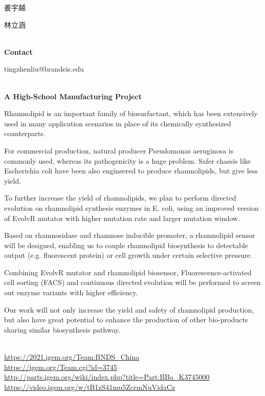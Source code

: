   姜宇越

  林立涵


\textbf{\\Contact}

  tingzhenliu@brandeis.edu


\textbf{\\A High-School Manufacturing Project\\}\begin{spacing}{1.5}

Rhamnolipid is an important family of biosurfactant, which has been extensively used in many application scenarios in place of its chemically synthesized counterparts.

For commercial production, natural producer Pseudomonas aeruginosa is commonly used, whereas its pathogenicity is a huge problem. Safer chassis like Escherichia coli have been also engineered to produce rhamnolipids, but give less yield.

To further increase the yield of rhamnolipids, we plan to perform directed evolution on rhamnolipid synthesis enzymes in E. coli, using an improved version of EvolvR mutator with higher mutation rate and larger mutation window.

Based on rhamnosidase and rhamnose inducible promoter, a rhamnolipid sensor will be designed, enabling us to couple rhamnolipid biosynthesis to detectable output (e.g. fluorescent protein) or cell growth under certain selective pressure.

Combining EvolvR mutator and rhamnolipid biosensor, Fluorescence-activated cell sorting (FACS) and continuous directed evolution will be performed to screen out enzyme variants with higher efficiency.

Our work will not only increase the yield and safety of rhamnolipid production, but also have great potential to enhance the production of other bio-products sharing similar biosynthesis pathway.\end{spacing}
\\

\url{https://2021.igem.org/Team:BNDS\_China }\\
\url{https://igem.org/Team.cgi?id=3745 }\\
\url{http://parts.igem.org/wiki/index.php?title=Part:BBa_K3745000 }\\
\url{https://video.igem.org/w/tB1zS41mu5ZcrmNuVidaCz }\\

\vfill{}









